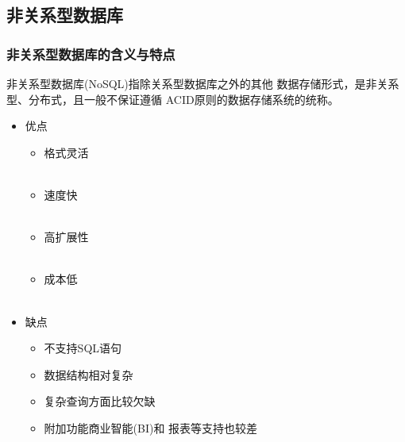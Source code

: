 \documentclass[t]{beamer}
\begin{document}
\subsection{非关系型数据库}

\begin{frame}
    \frametitle{ 非关系型数据库的含义与特点}
    非关系型数据库(NoSQL)指除关系型数据库之外的其他 数据存储形式，是非关系型、分布式，且一般不保证遵循 ACID原则的数据存储系统的统称。
\begin{multicols}{2}
\begin{itemize}
  \item 优点
\begin{itemize}
  \item 格式灵活 \\~\\\item 速度快\\~\\
  \item 高扩展性 \\~\\\item 成本低\\~\\
\end{itemize}
  \item 缺点
  \begin{itemize}
    \item 不支持SQL语句 \item 数据结构相对复杂
   \item  复杂查询方面比较欠缺\item 附加功能商业智能(BI)和 报表等支持也较差
  \end{itemize}
\end{itemize}
\end{multicols}
    

\end{frame}

\subsection{}
\end{document}

